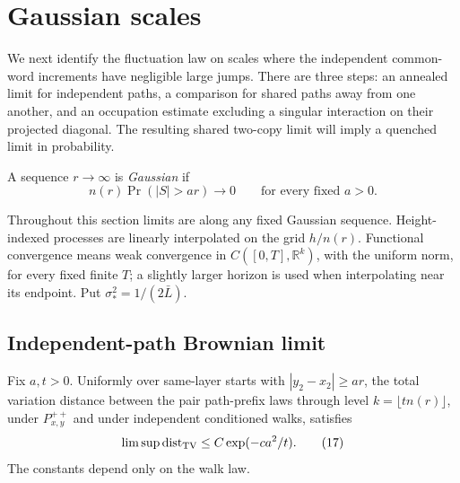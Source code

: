 \section{Gaussian scales}\label{sec:gaussian}

We next identify the fluctuation law on scales where the independent
common-word increments have negligible large jumps. There are three
steps: an annealed limit for independent paths, a comparison for shared
paths away from one another, and an occupation estimate excluding a
singular interaction on their projected diagonal. The resulting shared
two-copy limit will imply a quenched limit in probability.

\begin{definition}\label{gauss-sequence}
A sequence \(r\to\infty\) is \emph{Gaussian} if
\[
n(r)\Pr(|S|>a r)\longrightarrow0\qquad\text{for every fixed }a>0.
\tag{14}\label{eq:14}
\]
\end{definition}

Throughout this section limits are along any fixed Gaussian sequence.
Height-indexed processes are linearly interpolated on the grid
\(h/n(r)\). Functional convergence means weak convergence in
\(C([0,T],\mathbb R^k)\), with the uniform norm, for every fixed finite
\(T\); a slightly larger horizon is used when interpolating near its
endpoint. Put \(\sigma_*^2=1/(2\bar L)\).

\subsection{Independent-path Brownian limit}

\begin{lemma}\label{gauss-off-diagonal}
Fix \(a,t>0\). Uniformly over same-layer starts with
\(|y_2-x_2|\ge ar\), the total variation distance between the pair
path-prefix laws through level \(k=\lfloor tn(r)\rfloor\), under
\(P_{x,y}^{++}\) and under independent conditioned walks, satisfies
\[
\limsup {\rm dist}_{\rm TV}\le C\exp(-ca^2/t).
\tag{17}\label{eq:17}
\]
The constants depend only on the walk law.
\end{lemma}

